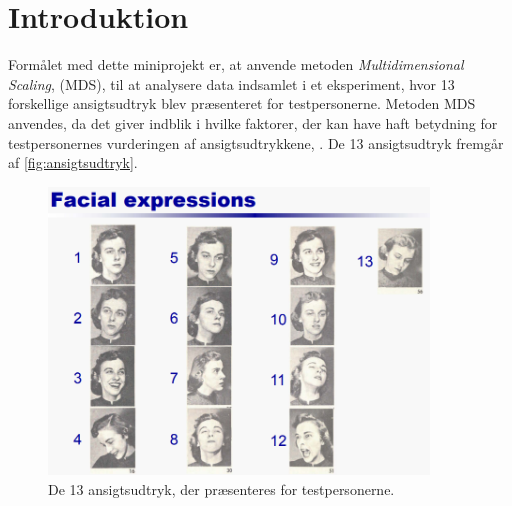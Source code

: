 \section*{Introduktion}
\label{Introduktion}
%
Formålet med dette miniprojekt er, at anvende metoden \textit{Multidimensional Scaling}, (MDS), til at analysere data indsamlet i et eksperiment, hvor 13 forskellige ansigtsudtryk blev præsenteret for testpersonerne. Metoden MDS anvendes, da det giver indblik i hvilke faktorer, der kan have haft betydning for testpersonernes vurderingen af ansigtsudtrykkene, \parencite[p.2]{Wickelmaier2003}. De 13 ansigtsudtryk fremgår af  \autoref{fig:ansigtsudtryk}. 
%
\begin{figure}[H]
\centering
\includegraphics[width = 0.9\textwidth]{Figure/FacialExpressions.PNG} 
\caption{De 13 ansigtsudtryk, der præsenteres for testpersonerne.}
\label{fig:ansigtsudtryk}
\end{figure}
%